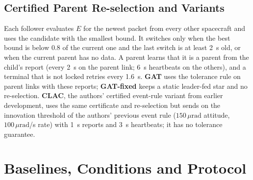 \documentclass[journal]{IEEEtran}
\newcommand{\urad}{\,\mu\text{rad}}
\begin{document}
\subsection{Certified Parent Re-selection and Variants}
Each follower evaluates $E$ for the newest packet from every other spacecraft and uses the candidate with the smallest bound. It switches only when the best bound is below $0.8$ of the current one and the last switch is at least 2~s old, or when the current parent has no data. A parent learns that it is a parent from the child's report (every 2~s on the parent link; 6~s heartbeats on the others), and a terminal that is not locked retries every 1.6~s. \textbf{GAT} uses the tolerance rule on parent links with these reports; \textbf{GAT-fixed} keeps a static leader-fed star and no re-selection. \textbf{CLAC}, the authors' certified event-rule variant from earlier development, uses the same certificate and re-selection but sends on the innovation threshold of the authors' previous event rule ($150\urad$ attitude, $100\urad$/s rate) with 1~s reports and 3~s heartbeats; it has no tolerance guarantee.

\section{Baselines, Conditions and Protocol}\label{sec:protocol}
\end{document}
